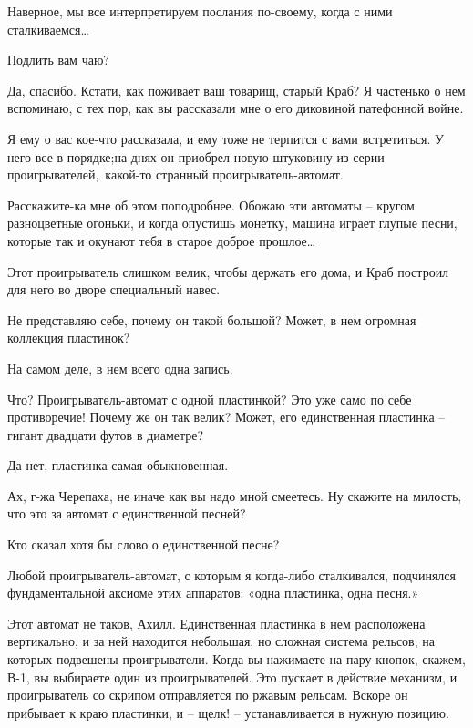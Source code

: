 \documentclass[../main.tex]{subfiles}
\begin{document}
\begin{Dialogue}
 Наверное, мы все интерпретируем послания по-своему, когда с ними сталкиваемся\ldots{}


 Подлить вам чаю?

 Да, спасибо. Кстати, как поживает ваш товарищ, старый Краб? Я частенько о нем вспоминаю, с тех пор, как вы рассказали мне о его диковиной патефонной войне.

 Я ему о вас кое-что рассказала, и ему тоже не терпится с вами встретиться. У него все в порядке;на днях он приобрел новую штуковину из серии проигрывателей,~какой-то странный проигрыватель-автомат.

 Расскажите-ка мне об этом поподробнее. Обожаю эти автоматы \--- кругом разноцветные огоньки, и когда опустишь монетку, машина играет глупые песни, которые так и окунают тебя в старое доброе прошлое\ldots{}

 Этот проигрыватель слишком велик, чтобы держать его дома, и Краб построил для него во дворе специальный навес.

 Не представляю себе, почему он такой большой? Может, в нем огромная коллекция пластинок?

 На самом деле, в нем всего одна запись.

 Что? Проигрыватель-автомат с одной пластинкой? Это уже само по себе противоречие! Почему же он так велик? Может, его единственная пластинка \--- гигант двадцати футов в диаметре?

 Да нет, пластинка самая обыкновенная.

 Ах, г-жа Черепаха, не иначе как вы надо мной смеетесь. Ну скажите на милость, что это за автомат с единственной песней?

 Кто сказал хотя бы слово о единственной песне?

 Любой проигрыватель-автомат, с которым я когда-либо сталкивался, подчинялся фундаментальной аксиоме этих аппаратов: «одна пластинка, одна песня.»

 Этот автомат не таков, Ахилл. Единственная пластинка в нем расположена вертикально, и за ней находится небольшая, но сложная система рельсов, на которых подвешены проигрыватели. Когда вы нажимаете на пару кнопок, скажем, В-1, вы выбираете один из проигрывателей. Это пускает в действие механизм, и проигрыватель со скрипом отправляется по ржавым рельсам. Вскоре он прибывает к краю пластинки, и \--- щелк! \--- устанавливается в нужную позицию.


\end{Dialogue}
\end{document}
